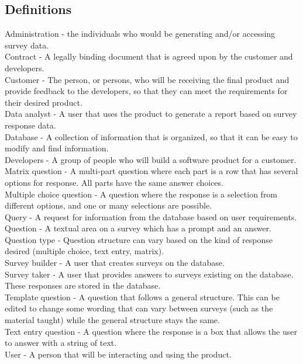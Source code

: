 \documentclass[letterpaper,10pt,serif, draftclsnofoot,onecolumn, compsoc, titlepage]{IEEEtran}
\begin{document}
\subsection{Definitions}
\noindent Administration - the individuals who would be generating and/or accessing survey data. \\
Contract - A legally binding document that is agreed upon by the customer and developers.  \\
Customer - The person, or persons, who will be receiving the final product and provide feedback to the developers, so that they can meet the requirements for their desired product. \\
Data analyst - A user that uses the product to generate a report based on survey response data. \\
Database - A collection of information that is organized, so that it can be easy to modify and find information. \\
Developers - A group of people who will build a software product for a customer. \\
Matrix question - A multi-part question where each part is a row that has several options for response. All parts have the
same answer choices.\\
Multiple choice question - A question where the response is a selection from different options, and one or many selections
are possible.\\
Query - A request for information from the database based on user requirements.\\
Question - A textual area on a survey which has a prompt and an answer.\\
Question type - Question structure can vary based on the kind of response desired (multiple choice, text entry, matrix). \\
Survey builder - A user that creates surveys on the database.\\
Survey taker - A user that provides answers to surveys existing on the database. These responses are stored in
the database.\\
Template question - A question that follows a general structure. This can be edited to change some wording that can
vary between surveys (such as the material taught) while the general structure stays the same.\\
Text entry question - A question where the response is a box that allows the user to answer with a string of text.\\
User - A person that will be interacting and using the product.
\end{document}
